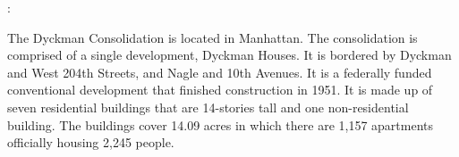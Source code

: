 : 

  

The Dyckman Consolidation is located in Manhattan. The consolidation is comprised of a single development, Dyckman Houses. It is bordered by Dyckman and West 204th Streets, and Nagle and 10th Avenues. It is a federally funded conventional development that finished construction in 1951. It is made up of seven residential buildings that are 14-stories tall and one non-residential building. The buildings cover 14.09 acres in which there are 1,157 apartments officially housing 2,245 people.   